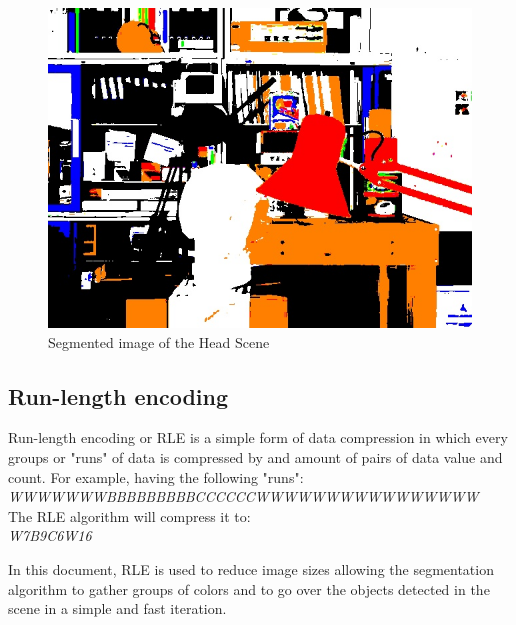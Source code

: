 \begin{figure}[h]
	\centering
	\includegraphics[width=0.5\linewidth]{../Images/c2/head_scene_tsukuba_seg}
	\caption{Segmented image of the Head Scene}
	\label{fig:head_scene_tsukuba_seg}
\end{figure}






\subsection{Run-length encoding}
Run-length encoding or RLE is a simple form of data compression in which every groups or "runs" of data is compressed by and amount of pairs of data value and count. For example, having the following "runs": \\

\textit{WWWWWWWBBBBBBBBBCCCCCCWWWWWWWWWWWWWWWW} \\

The RLE algorithm will compress it to: \\
\textit{W7B9C6W16}

In this document, RLE is used to reduce image sizes allowing the segmentation algorithm to gather groups of colors and to go over the objects detected in the scene in a simple and fast iteration. \\


